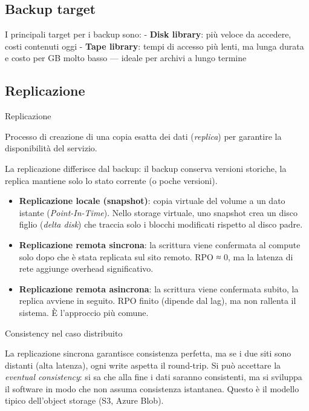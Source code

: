 \documentclass[
  italian,
  openany]{book}
\providecommand{\tightlist}{%
  \setlength{\itemsep}{0pt}\setlength{\parskip}{0pt}}
\begin{document}
\subsection{Backup target}\label{backup-target}

I principali target per i backup sono: - \textbf{Disk library}: più
veloce da accedere, costi contenuti oggi - \textbf{Tape library}: tempi
di accesso più lenti, ma lunga durata e costo per GB molto basso ---
ideale per archivi a lungo termine

\subsection{Replicazione}\label{replicazione}

\begin{calloutdefinition}{Replicazione}

Processo di creazione di una copia esatta dei dati (\emph{replica}) per
garantire la disponibilità del servizio.

\end{calloutdefinition}

La replicazione differisce dal backup: il backup conserva versioni
storiche, la replica mantiene solo lo stato corrente (o poche versioni).

\begin{itemize}
\tightlist
\item
  \textbf{Replicazione locale (snapshot)}: copia virtuale del volume a
  un dato istante (\emph{Point-In-Time}). Nello storage virtuale, uno
  snapshot crea un disco figlio (\emph{delta disk}) che traccia solo i
  blocchi modificati rispetto al disco padre.
\item
  \textbf{Replicazione remota sincrona}: la scrittura viene confermata
  al compute solo dopo che è stata replicata sul sito remoto. RPO ≈ 0,
  ma la latenza di rete aggiunge overhead significativo.
\item
  \textbf{Replicazione remota asincrona}: la scrittura viene confermata
  subito, la replica avviene in seguito. RPO finito (dipende dal lag),
  ma non rallenta il sistema. È l'approccio più comune.
\end{itemize}

\begin{callouttip}{Consistency nel caso distribuito}

La replicazione sincrona garantisce consistenza perfetta, ma se i due
siti sono distanti (alta latenza), ogni write aspetta il round-trip. Si
può accettare la \emph{eventual consistency}: si sa che alla fine i dati
saranno consistenti, ma si sviluppa il software in modo che non assuma
consistenza istantanea. Questo è il modello tipico dell'object storage
(S3, Azure Blob).

\end{callouttip}
\end{document}
